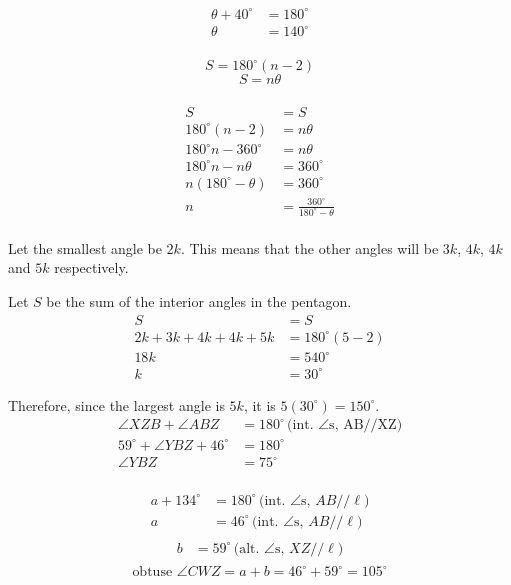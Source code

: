\documentclass[]{article}
\begin{document}
\[\begin{aligned}
	\theta+40^\circ&=180^\circ\\
	\theta&=140^\circ\\
\end{aligned}\]

\[S=180^\circ(n-2)\]
\[S=n\theta\]
\\
\[\begin{aligned}
	S&=S\\
	180^\circ(n-2)&=n\theta\\
	180^\circ n-360^\circ&=n\theta\\
	180^\circ n-n\theta&=360^\circ\\
	n\left(180^\circ-\theta\right)&=360^\circ\\
	n&=\frac{360^\circ}{180^\circ-\theta}\\
\end{aligned}\]

Let the smallest angle be \(2k\). This means that the other angles will be \(3k\), \(4k\), \(4k\) and \(5k\) respectively.

Let \(S\) be the sum of the interior angles in the pentagon.
\[\begin{aligned}
	S&=S\\
	2k+3k+4k+4k+5k&=180^\circ(5-2)\\
	18k&=540^\circ\\
	k&=30^\circ
\end{aligned}\]

Therefore, since the largest angle is \(5k\), it is \(5(30^\circ)=150^\circ\).
\\
\newpage
\[\begin{aligned}
	\angle XZB+\angle ABZ&=180^\circ\,\text{(int. }\angle\text{s, AB//XZ)}\\
	59^\circ+\angle YBZ+46^\circ&=180^\circ\\
	\angle YBZ&=\boxed{75^\circ}\\
\end{aligned}\]

\[\begin{aligned}
	a+134^\circ&=180^\circ\,\text{(int. }\angle\text{s},\,AB//\ell)\\
	a&=46^\circ\,\text{(int. }\angle\text{s},\,AB//\ell)\\
\end{aligned}\]
\[\begin{aligned}
	b&=59^\circ\,\text{(alt. }\angle\text{s},\,XZ//\ell)\\
\end{aligned}\]
\[\text{obtuse }\angle CWZ=a+b=46^\circ+59^\circ=\boxed{105^\circ}\]
\end{document}
